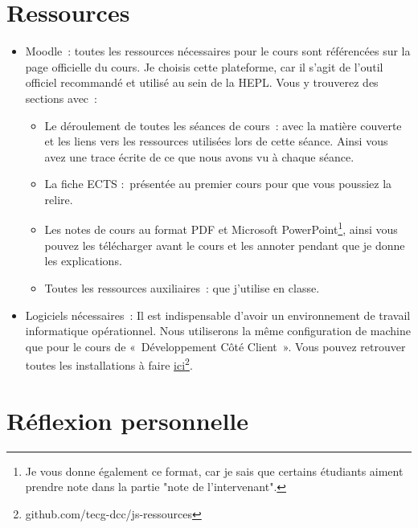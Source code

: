 \section{Ressources}
\begin{itemize}
    \item Moodle~: toutes les ressources nécessaires pour le cours sont référencées sur la page officielle du cours. Je choisis cette plateforme, car il s’agit de l’outil officiel recommandé et utilisé au sein de la HEPL. Vous y trouverez des sections avec~:
          \begin{itemize}
              \item Le déroulement de toutes les séances de cours~: avec la matière couverte et les liens vers les ressources utilisées lors de cette séance. Ainsi vous avez une trace écrite de ce que nous avons vu à chaque séance.
              \item La fiche ECTS :~présentée au premier cours pour que vous poussiez la relire.
              \item Les notes de cours au format PDF et Microsoft PowerPoint\footnote{Je vous donne également ce format, car je sais que certains étudiants aiment prendre note dans la partie "note de l'intervenant".}, ainsi vous pouvez les télécharger avant le cours et les annoter pendant que je donne les explications.
              \item Toutes les ressources auxiliaires~: que j'utilise en classe.
          \end{itemize}
    \item Logiciels nécessaires~: Il est indispensable d'avoir un environnement de travail informatique opérationnel. Nous utiliserons la même configuration de machine que pour le cours de «~Développement Côté Client~». Vous pouvez retrouver toutes les installations à faire \href{https://github.com/tecg-dcc/js-ressources#environnement-de-travail}{ici}\footnote{github.com/tecg-dcc/js-ressources}.
\end{itemize}
\clearpage
\section*{Réflexion personnelle}

